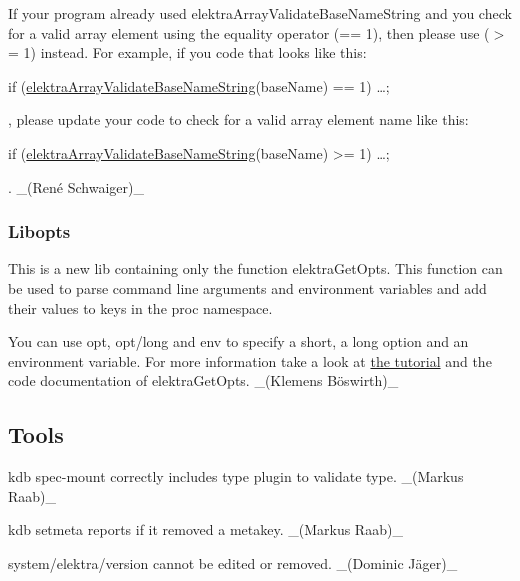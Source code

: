 If your program already used {\ttfamily elektra\+Array\+Validate\+Base\+Name\+String} and you check for a valid array element using the equality operator ({\ttfamily == 1}), then please use ({\ttfamily $>$= 1}) instead. For example, if you code that looks like this\+:


\begin{DoxyCode}
\textcolor{keywordflow}{if} (\hyperlink{array_8c_ab2eb25a64ded91feb47e58af8e62314a}{elektraArrayValidateBaseNameString}(baseName) == 1) …;
\end{DoxyCode}


, please update your code to check for a valid array element name like this\+:


\begin{DoxyCode}
\textcolor{keywordflow}{if} (\hyperlink{array_8c_ab2eb25a64ded91feb47e58af8e62314a}{elektraArrayValidateBaseNameString}(baseName) >= 1) …;
\end{DoxyCode}


. \+\_\+(René Schwaiger)\+\_\+

\subsubsection*{Libopts}


\begin{DoxyItemize}
\item This is a new lib containing only the function {\ttfamily elektra\+Get\+Opts}. This function can be used to parse command line arguments and environment variables and add their values to keys in the proc namespace.

You can use {\ttfamily opt}, {\ttfamily opt/long} and {\ttfamily env} to specify a short, a long option and an environment variable. For more information take a look at \hyperlink{doc_tutorials_command-line-options_md}{the tutorial} and the code documentation of {\ttfamily elektra\+Get\+Opts}. \+\_\+(Klemens Böswirth)\+\_\+
\end{DoxyItemize}

\subsection*{Tools}


\begin{DoxyItemize}
\item {\ttfamily kdb spec-\/mount} correctly includes type plugin to validate {\ttfamily type}. \+\_\+(\+Markus Raab)\+\_\+
\item {\ttfamily kdb setmeta} reports if it removed a metakey. \+\_\+(\+Markus Raab)\+\_\+
\item {\ttfamily system/elektra/version} cannot be edited or removed. \+\_\+(Dominic Jäger)\+\_\+
\end{DoxyItemize}

